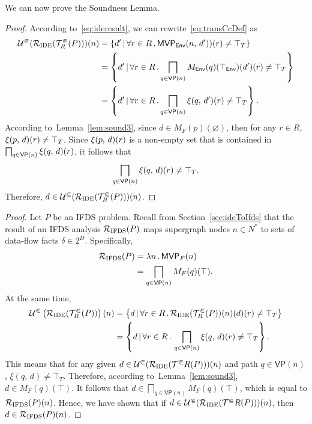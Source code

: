 We can now prove the Soundness Lemma.

\sound*
\begin{proof}
According to~\eqref{eq:ideresult}, we can rewrite~\eqref{eq:transCcDef} as
\begin{align*}\label{eq:transCcResultCc}
  \mathcal U^\Subset(\mathcal R_{\text{IDE}}(\mathcal T^\Subset_R(P)))(n)
  &=\{d'\,|\,\forall r\in R\,.\,\textsf{MVP}_{\textsf{Env}}(n,\,d'))(r)\ne\top_T\}\\
  &=\left\{d'\,|\,\forall r\in R\,.\bigsqcap_{q\in\textsf{VP}(n)}M_\textsf{Env}(q)(\top_\textsf{Env})(d')(r)\ne\top_T\right\}\\
  &=\left\{d'\,|\,\forall r\in R\,.\bigsqcap_{q\in\textsf{VP}(n)}\xi(q,\,d')(r)\ne\top_T\right\}.
\end{align*}
  According to~Lemma~\ref{lem:sound3}, since $d\in M_F(p)(\varnothing)$, then for any $r\in R$, $\xi(p,\,d)(r)\ne\top_T$. 
  Since $\xi(p,\,d)(r)$ is a non-empty set that is contained in $\bigsqcap_{q\in\textsf{VP}(n)}\xi(q,\,d)(r)$, it follows that $$\bigsqcap_{q\in\textsf{VP}(n)}\xi(q,\,d)(r)\ne\top_T.$$ Therefore, $d\in \mathcal U^\Subset(\mathcal R_{\text{IDE}}(\mathcal T^\Subset_R(P)))(n)$.
\end{proof}

\precision*
\begin{proof}
  Let $P$ be an IFDS problem. Recall from Section~\ref{sec:ideToIfds} that the result of an IFDS analysis $\mathcal R_{\text{IFDS}}(P)$ maps supergraph
  nodes $n\in N^*$ to sets of data-flow facts $\delta\in2^D$. Specifically,
  \begin{align*}
    \mathcal R_{\text{IFDS}}(P)&=\lambda n\,.\,\textsf{MVP}_{F}(n)\\
    &=\bigsqcap_{q\in\textsf{VP}(n)}M_F(q)(\top).
  \end{align*}
  At the same time,
  \begin{align*}
    \mathcal U^\Subset\left(\mathcal R_{\text{IDE}}(\mathcal T^\Subset_R(P))\right)(n)
    &=\left\{d\,|\,\forall r\in R\,.\,\mathcal R_{\text{IDE}}(\mathcal T^\Subset_R(P))(n)(d)(r)\ne\top_T\right\}\\
    &=\left\{d\,|\,\forall r\in R\,.\,\bigsqcap_{q\in\textsf{VP}(n)}\xi(q,\,d)(r)\ne\top_T\right\}.
  \end{align*}
  This means that for any given $d\in\mathcal U^\Subset(\mathcal R_{\text{IDE}}(\mathcal T^\Subset R(P)))(n)$ and path $q\in\textsf{VP}(n)$, $\xi(q,\,d)\ne\top_T$. Therefore, according to~Lemma~\ref{lem:sound3}, $d\in M_F(q)(\top)$. It follows that $d\in\bigsqcap_{q\in\textsf{VP}(n)}M_F(q)(\top)$, which is equal to $\mathcal R_{\text{IFDS}}(P)(n)$. 
  Hence, we have shown that if $d\in\mathcal U^\Subset(\mathcal R_{\text{IDE}}(\mathcal T^\Subset R(P)))(n)$, then $d\in\mathcal R_{\text{IFDS}}(P)(n)$.
\end{proof}

